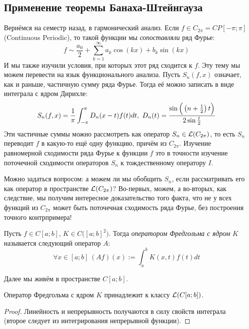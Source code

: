 \subsection*{Применение теоремы Банаха-Штейнгауза}

\begin{problem}
	Вернёмся на семестр назад, в гармонический анализ. Если $f \in C_{2\pi} = CP[-\pi; \pi]$ (Continuous Periodic), то такой функции мы \textit{сопоставляли} ряд Фурье:
	\[
		f \sim \frac{a_0}{2} + \sum_{k = 1}^\infty a_k\cos(kx) + b_k\sin(kx)
	\]
	И мы также изучили условия, при которых этот ряд сходится к $f$. Эту тему мы можем перевести на язык функционального анализа. Пусть $S_n(f, x)$ означает, как и раньше, частичную сумму ряда Фурье. Тогда её можно записать в виде интеграла с ядром Дирихле:
	\[
		S_n(f, x) = \frac{1}{\pi}\int_{-\pi}^\pi D_n(x - t)f(t)dt,\ D_n(t) = \frac{\sin\Big(\left(n + \frac{1}{2}\right)t\Big)}{2\sin\frac{t}{2}}
	\]
	Эти частичные суммы можно рассмотреть как оператор $S_n \in \mathcal{L}(C_{2\pi})$, то есть $S_n$ переводит $f$ в какую-то ещё одну функцию, причём из $C_{2\pi}$. Изучение равномерной сходимости ряда Фурье к функции $f$ это в точности изучение поточечной сходимости операторов $S_n$ к тождественному оператору $I$.
	
	Можно задаться вопросом: а можем ли мы обобщить $S_n$, если рассматривать его как оператор в пространстве $\mathcal{L}(C_{2\pi})$? Во-первых, можем, а во-вторых, как следствие, мы получим интересное доказательство того факта, что не у всех функций из $C_{2\pi}$ может быть поточечная сходимость ряда Фурье, без построения точного контрпримера!
\end{problem}

\begin{definition}
	Пусть $f \in C[a; b]$, $K \in C\big([a; b]^2\big)$. Тогда \textit{оператором Фредгольма с ядром $K$} называется следующий оператор $A$:
	\[
		\forall x \in [a; b]\ (Af)(x) := \int_a^b K(x, t)f(t)dt
	\]
\end{definition}

\begin{note}
	Далее мы живём в пространстве $C[a; b]$.
\end{note}

\begin{proposition}
	Оператор Фредгольма с ядром $K$ принадлежит к классу $\mathcal{L}(C[a; b])$.
\end{proposition}

\begin{proof}
	Линейность и непрерывность получаются в силу свойств интеграла (второе следует из интегрирования непрерывной функции).
\end{proof}

